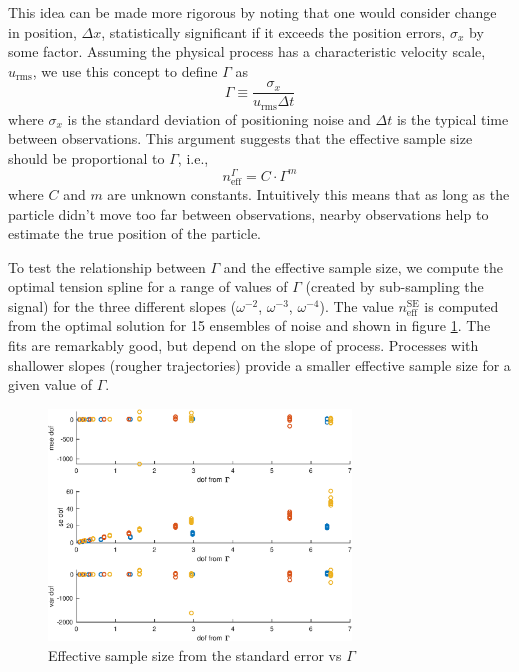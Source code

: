 \documentclass[10pt,journal]{IEEEtran}
\begin{document}
This idea can be made more rigorous by noting that one would consider change in position, $\Delta x$, statistically significant if it exceeds the position errors, $\sigma_x$ by some factor.  Assuming the physical process has a characteristic velocity scale, $u_{\textrm{rms}}$, we use this concept to define $\Gamma$ as
\begin{equation}
\label{gamma_equation}
\Gamma \equiv \frac{\sigma_x}{u_{\textrm{rms}}\Delta t}
\end{equation}
where $\sigma_x$ is the standard deviation of positioning noise and $\Delta t$ is the typical time between observations. This argument suggests that the effective sample size should be proportional to $\Gamma$, i.e.,
\begin{equation}
n_{\textrm{eff}}^\Gamma = C \cdot \Gamma^m
\end{equation}
where $C$ and $m$ are unknown constants. Intuitively this means that as long as the particle didn't move too far between observations, nearby observations help to estimate the true position of the particle.

To test the relationship between $\Gamma$ and the effective sample size, we compute the optimal tension spline for a range of values of $\Gamma$ (created by sub-sampling the signal) for the three different slopes ($\omega^{-2}$, $\omega^{-3}$, $\omega^{-4}$). The value $n_{\textrm{eff}}^\textrm{SE}$ is computed from the optimal solution for 15 ensembles of noise and shown in figure \ref{dofVsGamma}. The fits are remarkably good, but depend on the slope of process. Processes with shallower slopes (rougher trajectories) provide a smaller effective sample size for a given value of $\Gamma$.

\begin{figure}
  \centerline{\includegraphics[width=19pc,angle=0]{figures/dofVsGamma}}
  
  \caption{Effective sample size from the standard error vs $\Gamma$}
  \label{dofVsGamma}
\end{figure}
\end{document}
